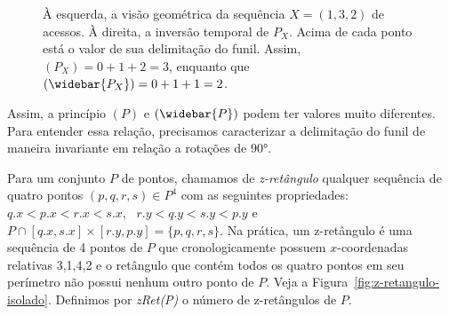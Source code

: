 \begin{figure}
    \caption{À esquerda, a visão geométrica da sequência $X = (1,3,2)$ de acessos. À direita, a inversão temporal de $P_X$. Acima de cada ponto está o valor de sua delimitação do funil. Assim, \Funil$(P_X) = 0 + 1 + 2 = 3$, enquanto que \Funil$(\protect \widebar{P_X}) = 0 + 1 + 1 = 2$.}
\label{fig:espelhamento-de-funil-2}
\end{figure}

Assim, a princípio \Funil$(P)$ e \Funil$(\widebar{P})$ podem ter valores muito diferentes. Para entender essa relação, precisamos caracterizar a delimitação do funil de maneira invariante em relação a rotações de 90°. 

Para um conjunto $P$ de pontos, chamamos de \textit{z-retângulo} qualquer sequência de quatro pontos $(p,q,r,s) \in P^4$ com as seguintes propriedades: $q.x < p.x < r.x < s.x$, \ $r.y < q.y < s.y < p.y$ e $P \cap [q.x,s.x] \times [r.y,p.y]  = \{p,q,r,s\}$. Na prática, um z-retângulo é uma sequência de 4 pontos de $P$ que cronologicamente possuem $x$-coordenadas relativas 3,1,4,2 e o retângulo que contém todos os quatro pontos em seu perímetro não possui nenhum outro ponto de $P$. Veja a Figura~\ref{fig:z-retangulo-isolado}. Definimos por \textit{zRet(P)} o número de z-retângulos de $P$.

